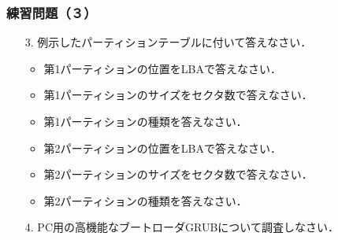 \documentclass[unicode]{beamer}                   %
\begin{document}
\begin{frame}
  \frametitle{練習問題（３）}
  \begin{enumerate}
  \item[3.] 例示したパーティションテーブルに付いて答えなさい．
    \begin{itemize}
    \item 第1パーティションの位置をLBAで答えなさい．
    \item 第1パーティションのサイズをセクタ数で答えなさい．
    \item 第1パーティションの種類を答えなさい．
    \item 第2パーティションの位置をLBAで答えなさい．
    \item 第2パーティションのサイズをセクタ数で答えなさい．
    \item 第2パーティションの種類を答えなさい．
    \end{itemize}
    \vfill
  \item[4.] PC用の高機能なブートローダGRUBについて調査しなさい．
    \vfill
  \end{enumerate}
\end{frame}

\end{document}

